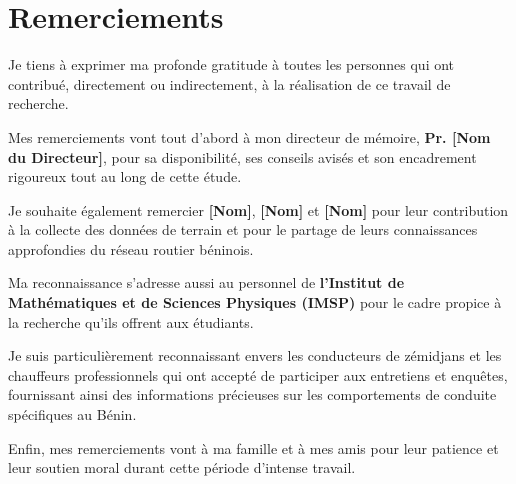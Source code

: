 \chapter*{Remerciements}
\thispagestyle{empty}

Je tiens à exprimer ma profonde gratitude à toutes les personnes qui ont contribué, directement ou indirectement, à la réalisation de ce travail de recherche.

\vspace{0.5cm}

Mes remerciements vont tout d'abord à mon directeur de mémoire, \textbf{Pr. [Nom du Directeur]}, pour sa disponibilité, ses conseils avisés et son encadrement rigoureux tout au long de cette étude.

\vspace{0.5cm}

Je souhaite également remercier \textbf{[Nom]}, \textbf{[Nom]} et \textbf{[Nom]} pour leur contribution à la collecte des données de terrain et pour le partage de leurs connaissances approfondies du réseau routier béninois.

\vspace{0.5cm}

Ma reconnaissance s'adresse aussi au personnel de \textbf{l'Institut de Mathématiques et de Sciences Physiques (IMSP)} pour le cadre propice à la recherche qu'ils offrent aux étudiants.

\vspace{0.5cm}

Je suis particulièrement reconnaissant envers les conducteurs de zémidjans et les chauffeurs professionnels qui ont accepté de participer aux entretiens et enquêtes, fournissant ainsi des informations précieuses sur les comportements de conduite spécifiques au Bénin.

\vspace{0.5cm}

Enfin, mes remerciements vont à ma famille et à mes amis pour leur patience et leur soutien moral durant cette période d'intense travail.

